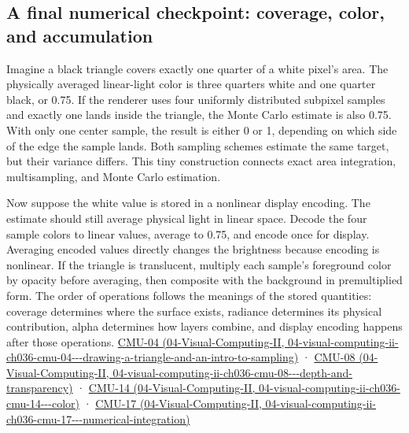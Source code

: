 \subsection{A final numerical checkpoint: coverage, color, and accumulation}\label{03-visual-computing-i-ch015-a-final-numerical-checkpoint-coverage-color-and-accumulation}

Imagine a black triangle covers exactly one quarter of a white pixel's area. The physically averaged linear-light color is three quarters white and one quarter black, or 0.75. If the renderer uses four uniformly distributed subpixel samples and exactly one lands inside the triangle, the Monte Carlo estimate is also 0.75. With only one center sample, the result is either 0 or 1, depending on which side of the edge the sample lands. Both sampling schemes estimate the same target, but their variance differs. This tiny construction connects exact area integration, multisampling, and Monte Carlo estimation.

Now suppose the white value is stored in a nonlinear display encoding. The estimate should still average physical light in linear space. Decode the four sample colors to linear values, average to 0.75, and encode once for display. Averaging encoded values directly changes the brightness because encoding is nonlinear. If the triangle is translucent, multiply each sample's foreground color by opacity before averaging, then composite with the background in premultiplied form. The order of operations follows the meanings of the stored quantities: coverage determines where the surface exists, radiance determines its physical contribution, alpha determines how layers combine, and display encoding happens after those operations. \href{../04-Visual-Computing-II/main.pdf\#nameddest=04-visual-computing-ii-ch036-cmu-04---drawing-a-triangle-and-an-intro-to-sampling}{CMU-04 (04-Visual-Computing-II, 04-visual-computing-ii-ch036-cmu-04-\/-\/-drawing-a-triangle-and-an-intro-to-sampling)} · \href{../04-Visual-Computing-II/main.pdf\#nameddest=04-visual-computing-ii-ch036-cmu-08---depth-and-transparency}{CMU-08 (04-Visual-Computing-II, 04-visual-computing-ii-ch036-cmu-08-\/-\/-depth-and-transparency)} · \href{../04-Visual-Computing-II/main.pdf\#nameddest=04-visual-computing-ii-ch036-cmu-14---color}{CMU-14 (04-Visual-Computing-II, 04-visual-computing-ii-ch036-cmu-14-\/-\/-color)} · \href{../04-Visual-Computing-II/main.pdf\#nameddest=04-visual-computing-ii-ch036-cmu-17---numerical-integration}{CMU-17 (04-Visual-Computing-II, 04-visual-computing-ii-ch036-cmu-17-\/-\/-numerical-integration)}

